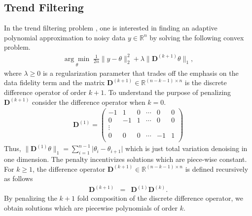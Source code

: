 \documentclass[12pt]{article}
\begin{document}
	\subsection{Trend Filtering}
	
	In the trend filtering problem \citep{Kim2009, Tib2014}, one is interested in finding an adaptive polynomial approximation to noisy data $y \in \mathbb{R}^n$ by solving the following convex problem.
	\begin{eqnarray}
		\underset{\theta}{\arg\min}\; \frac{1}{2n} \lVert y - \theta \rVert_2^2 + \lambda \lVert \mathbf{D}^{(k+1)}\theta \rVert_1,
	\end{eqnarray}
	where $\lambda \geq 0$ is a regularization parameter that trades off the emphasis on the data fidelity term and the matrix $\mathbf{D}^{(k+1)} \in \mathbb{R}^{(n - k -1) \times n}$ is the discrete difference operator of order $k+1$. To understand the purpose of penalizing $\mathbf{D}^{(k+1)}$ consider the difference operator when $k = 0$.
	\begin{eqnarray}
		\mathbf{D}^{(1)} = \begin{pmatrix}
			-1 & 1 & 0 & \cdots & 0 & 0 \\
			0 & -1 & 1 & \cdots & 0 & 0 \\
			\vdots & & & & & \\
			0 & 0 & 0 & \cdots & -1 & 1 \\
		\end{pmatrix}
	\end{eqnarray}
	Thus, $\lVert \mathbf{D}^{(1)}\theta \rVert_1 = \sum_{i=1}^{n-1} \lvert \theta_i - \theta_{i+1} \rvert$ which is just total variation denoising in one dimension. The penalty incentivizes solutions which are piece-wise constant. For $k \geq 1$, the difference operator $\mathbf{D}^{(k+1)} \in \mathbb{R}^{(n-k-1) \times n}$ is defined recursively as follows
	\begin{eqnarray}
		\mathbf{D}^{(k+1)} & = & \mathbf{D}^{(1)}\mathbf{D}^{(k)}.
	\end{eqnarray}
	By penalizing the $k+1$ fold composition of the discrete difference operator, we obtain solutions which are piecewise polynomials of order $k$.
	
\end{document}

